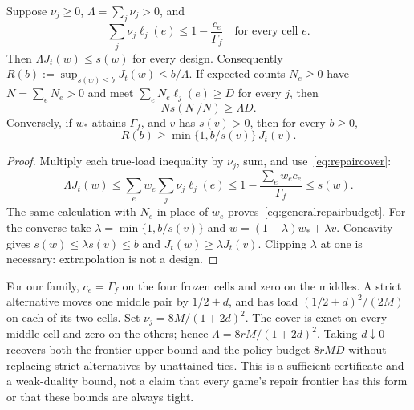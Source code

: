 \begin{proposition}
\label{prop:repaircertificate}
Suppose $\nu_j\ge0$, $\Lambda=\sum_j\nu_j>0$, and
\begin{equation}
\sum_j\nu_j\ell_j(e)\le1-\frac{c_e}{\Gamma_f}\quad\text{for every cell }e.
\label{eq:repaircover}
\end{equation}
Then $\Lambda J_t(w)\le s(w)$ for every design. Consequently
$R(b):=\sup_{s(w)\le b}J_t(w)\le b/\Lambda$.
If expected counts $N_e\ge0$ have $N=\sum_eN_e>0$ and meet
$\sum_eN_e\ell_j(e)\ge D$ for every $j$, then
\begin{equation}
N s(N_{\cdot}/N)\ge\Lambda D.
\label{eq:generalrepairbudget}
\end{equation}
Conversely, if $w_*$ attains $\Gamma_f$, and $v$ has $s(v)>0$, then for every $b\ge0$,
\begin{equation}
R(b)\ge\min\{1,b/s(v)\}\,J_t(v).
\label{eq:clippedrepair}
\end{equation}
\end{proposition}
\begin{proof}
Multiply each true-load inequality by $\nu_j$, sum, and use~\eqref{eq:repaircover}:
\[
\Lambda J_t(w)\le\sum_e w_e\sum_j\nu_j\ell_j(e)
\le1-\frac{\sum_e w_ec_e}{\Gamma_f}\le s(w).
\]
The same calculation with $N_e$ in place of $w_e$ proves~\eqref{eq:generalrepairbudget}.
For the converse take $\lambda=\min\{1,b/s(v)\}$ and
$w=(1-\lambda)w_*+\lambda v$. Concavity gives $s(w)\le\lambda s(v)\le b$ and
$J_t(w)\ge\lambda J_t(v)$. Clipping $\lambda$ at one is necessary: extrapolation is not a design.
\end{proof}

For our family, $c_e=\Gamma_f$ on the four frozen cells and zero on the middles. A strict
alternative moves one middle pair by $1/2+d$, and has load $(1/2+d)^2/(2M)$ on each of its
two cells. Set $\nu_j=8M/(1+2d)^2$. The cover is exact on every middle cell and zero on the
others; hence $\Lambda=8rM/(1+2d)^2$. Taking $d\downarrow0$ recovers both the frontier upper
bound and the policy budget $8rMD$ without replacing strict alternatives by unattained ties.
This is a sufficient certificate and a weak-duality bound, not a claim that every game's
repair frontier has this form or that these bounds are always tight.

